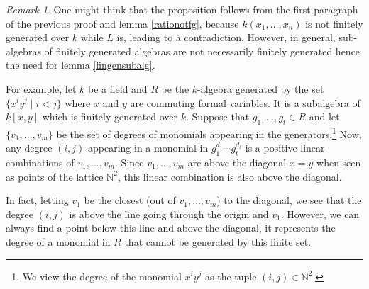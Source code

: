 \documentclass{tufte-handout} %
\theoremstyle{definition}
\theoremstyle{remark}
\newtheorem{rem}[thm]{Remark}
\newcommand{\N}{\mathbb{N}}
\begin{document}
\begin{rem}
	One might think that the proposition follows from the first paragraph of the previous proof and lemma \ref{rationotfg}, because $k(x_1, \dots, x_n)$ is not finitely generated over $k$ while $L$ is, leading to a contradiction. However, in general, sub-algebras of finitely generated algebras are not necessarily finitely generated hence the need for lemma \ref{fingensubalg}.
	
	For example, let $k$ be a field and $R$ be the $k$-algebra generated by the set $\{x^iy^j \mid i< j\}$  where $x$ and $y$ are commuting formal variables. It is a subalgebra of $k[x,y]$ which is finitely generated over $k$. Suppose that $g_1, \dots, g_t \in R$ and let $\{v_1, \dots, v_m\}$ be the set of degrees of monomials appearing in the generators.\footnote{We view the degree of the monomial $x^iy^j$ as the tuple $(i,j) \in \N^2$.} Now, any degree $(i,j)$ appearing in a monomial in $g_1^{d_1}\cdots g_t^{d_t}$ is a positive linear combinations of $v_1, \dots, v_m$. Since $v_1, \dots, v_m$ are above the diagonal $x = y$ when seen as points of the lattice $\N^2$, this linear combination is also above the diagonal.
	
	In fact, letting $v_1$ be the closest (out of $v_1, \dots, v_m$) to the diagonal, we see that the degree $(i,j)$ is above the line going through the origin and $v_1$. However, we can always find a point below this line and above the diagonal, it represents the degree of a monomial in $R$ that cannot be generated by this finite set. %
\end{rem}
\end{document}
